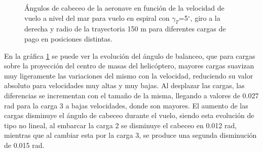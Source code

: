 \begin{figure}
	\centering
	\caption{Ángulos de cabeceo de la aeronave en función de la velocidad de vuelo a nivel del mar para vuelo en espiral con $\gamma_T$=5$^\circ$, giro a la derecha y radio de la trayectoria 150 m para diferentes cargas de pago en posiciones distintas.}
	\label{ThetaVEMPL}
\end{figure}

En la gráfica \ref{ThetaVEMPL} se puede ver la evolución del ángulo de balanceo, que para cargas sobre la proyección del centro de masas del helicóptero, mayores cargas suavizan muy ligeramente las variaciones del mismo con la velocidad, reduciendo su valor absoluto para velocidades muy altas y muy bajas. Al desplazar las cargas, las diferencias se incrementan con el tamaño de la misma, llegando a valores de 0.027 rad para la carga 3 a bajas velocidades, donde son mayores. El aumento de las cargas disminuye el ángulo de cabeceo durante el vuelo, siendo esta evolución de tipo no lineal, al embarcar la carga 2 se disminuye el cabeceo en 0.012 rad, mientras que al cambiar esta por la carga 3, se produce una segunda disminución de 0.015 rad.


